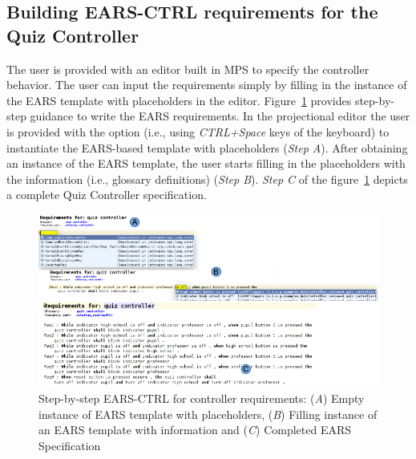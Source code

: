 \subsection{Building \textsf{EARS-CTRL} requirements for the Quiz Controller}
\vspace{-.2cm}
The user is provided with an editor built in MPS \cite{mps} to specify the
controller behavior. The user can input the requirements simply by filling in the instance of the EARS template with
placeholders in the editor. Figure~\ref{fig:EARS_req} provides step-by-step
guidance to write the EARS requirements. In the projectional editor the user is
provided with the option (i.e., using \emph{CTRL+Space} keys of the keyboard) to
instantiate the EARS-based template with placeholders (\emph{Step A}). After obtaining an
instance of the EARS template, the user starts filling in the placeholders with the information
(i.e., glossary definitions) (\emph{Step B}). \emph{Step C} of the
figure~\ref{fig:EARS_req} depicts a complete Quiz Controller specification.
\begin{figure}[!h]
\centering
\includegraphics[width=1.2\textwidth]{./images/Req_Spec_Steps.png}
\caption{Step-by-step \textsf{EARS-CTRL} for controller requirements: (\emph{A})
Empty instance of EARS template with placeholders, (\emph{B}) Filling instance of an EARS
template with information and (\emph{C}) Completed EARS Specification }
\label{fig:EARS_req}
\end{figure}
\vspace{-.2cm}
